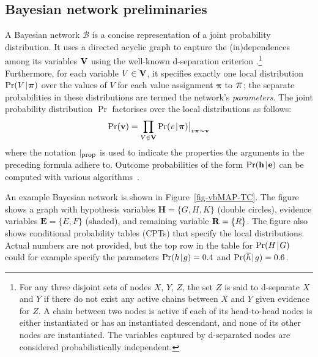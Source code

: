 \documentclass[10pt,a4paper]{paper}
\theoremstyle{definition}
\newcommand{\vbpi}{\boldsymbol\pi}
\newcommand{\vpi}{\scalebox{1.4}{\ensuremath\pi}}
\newcommand{\hyp}{\mathbf{h}}
\newcommand{\ev}{\mathbf{e}}
\newcommand{\hyps}{\mathbf{H}}
\newcommand{\evs}{\mathbf{E}}
\newcommand{\giv}[1]{\big\vert_{#1}}
\newcommand{\smallgiv}[1]{\vert_{#1}}
\newcommand{\newmid}{\hspace{0.9pt}\vert\hspace{0.9pt}}
\begin{document}
\subsection{Bayesian network preliminaries}\label{sec:bayesian:prelim}
A Bayesian network ${\mathcal B}$ is a concise representation of a joint probability distribution. It uses a directed acyclic graph to capture the (in)dependences among its variables ${\bf V}$ using the well-known d-separation criterion \cite{Pearl:1988wk}.\footnote{For any three disjoint sets of
nodes $X$, $Y$, $Z$, the set $Z$ is said to d-separate $X$ and $Y$ if there do not exist any active chains between $X$ and $Y$ given evidence for $Z$. A chain between two nodes is active if each of its head-to-head nodes is either instantiated or has an instantiated descendant, and none of its other nodes are instantiated. The variables captured by d-separated nodes are considered probabilistically independent.}  Furthermore, for each variable $V\in{\bf V}$, it specifies exactly one local distribution $\Pr(V\newmid \vbpi)$ over the values of $V$ for each value assignment $\vbpi$ to $\vpi$;  the separate probabilities in these distributions are termed the network's \emph{parameters}. The joint probability distribution $\Pr$ factorises over the local distributions as follows:
\begin{equation*}
\Pr({\bf v})=\prod_{V \in {\bf V}}\Pr(v\newmid \vbpi)\giv{v\vbpi\sim {\bf v}}
\end{equation*}
where the notation $\smallgiv{\mbox{\footnotesize prop}}$ is used to indicate the properties the arguments in the preceding formula adhere to. Outcome probabilities of the form $\Pr(\hyp\newmid\ev)$ can be computed with various algorithms~\cite{Jensen:2007fb}. 

An example Bayesian network is shown in Figure~\ref{fig-vbMAP-TC}. The figure shows a graph with hypothesis variables $\hyps = \{G,H,K\}$ (double circles), evidence variables $\evs= \{E,F\}$ (shaded), and remaining variable ${\bf R} = \{R\}$. 
The figure also shows conditional probability tables (CPTs) that specify the local distributions. Actual numbers are not provided, but the top row in the table for $\Pr(H\newmid G)$ could for example specify the parameters $\Pr(h\newmid g)=0.4$ and $\Pr(\overline{h}\newmid g)=0.6$. 
\end{document}
